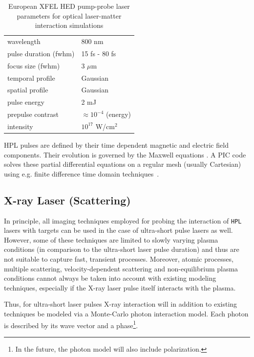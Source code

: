 \documentclass[12pt]{scrartcl}
\begin{document}
\begin{table}[h!]
\centering
\begin{tabular}{|l|l|}
  \hline wavelength & 800 nm \\
  pulse duration (fwhm) & 15 fs - 80 fs \\
  focus size (fwhm)  & 3 $\mu\text{m}$ \\
  temporal profile &  Gaussian \\
  spatial profile &  Gaussian \\
  pulse energy & 2 mJ \\
  prepulse contrast & $\approx 10^{-4}$ (energy)\\
  intensity  & $10^{17}$ W/cm$^2$ \\
  \hline
\end{tabular}
\caption{European XFEL HED pump-probe laser parameters for optical laser-matter interaction
simulations}
\label{tab:short_pulse_laser_parameters}
\end{table}

HPL pulses are defined by their time dependent
magnetic and electric field components. Their evolution is governed by the
Maxwell equations \cite{Jackson1975}. A PIC code solves these partial differential
equations on a regular mesh (usually
Cartesian) using e.g. finite difference time domain techniques~\cite{Yee1966}.

\subsection{X-ray Laser (Scattering)}

In principle, all imaging techniques employed for probing the interaction
of \texttt{HPL} lasers with targets can be used in the case of ultra-short
pulse lasers as well. However, some of these techniques are limited to slowly
varying plasma conditions (in comparison to the ultra-short laser pulse duration)
and thus are not suitable to capture fast, transient processes. Moreover, atomic
processes, multiple scattering, velocity-dependent scattering and
non-equilibrium plasma conditions cannot always be taken into account with
existing modeling techniques, especially if the X-ray laser pulse itself interacts
with the plasma.

Thus, for ultra-short laser pulses X-ray interaction will in addition to existing
techniques be modeled via a Monte-Carlo photon interaction model. Each photon is
described by its wave vector and a phase\footnote{In the future, the photon model
will also include polarization.}.
\end{document}

